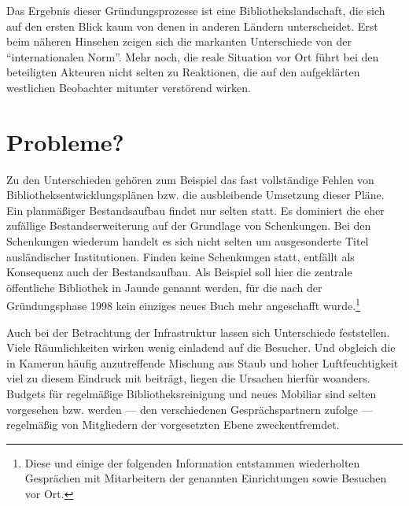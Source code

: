 \documentclass[a4paper,
fontsize=11pt,
oneside,
numbers=noperiodatend,
parskip=half-,
bibliography=totoc,
final
]{scrartcl}
\begin{document}
Das Ergebnis dieser Gründungsprozesse ist eine Bibliothekslandschaft,
die sich auf den ersten Blick kaum von denen in anderen Ländern
unterscheidet. Erst beim näheren Hinsehen zeigen sich die markanten
Unterschiede von der \enquote{internationalen Norm}. Mehr noch, die
reale Situation vor Ort führt bei den beteiligten Akteuren nicht selten
zu Reaktionen, die auf den aufgeklärten westlichen Beobachter mitunter
verstörend wirken.

\section*{Probleme?}\label{probleme}

Zu den Unterschieden gehören zum Beispiel das fast vollständige Fehlen
von Bibliotheksentwicklungsplänen bzw. die ausbleibende Umsetzung dieser
Pläne. Ein planmäßiger Bestandsaufbau findet nur selten statt. Es
dominiert die eher zufällige Bestandserweiterung auf der Grundlage von
Schenkungen. Bei den Schenkungen wiederum handelt es sich nicht selten
um ausgesonderte Titel ausländischer Institutionen. Finden keine
Schenkungen statt, entfällt als Konsequenz auch der Bestandsaufbau. Als
Beispiel soll hier die zentrale öffentliche Bibliothek in Jaunde genannt
werden, für die nach der Gründungsphase 1998 kein einziges neues Buch
mehr angeschafft wurde.\footnote{Diese und einige der folgenden
  Information entstammen wiederholten Gesprächen mit Mitarbeitern der
  genannten Einrichtungen sowie Besuchen vor Ort.}

Auch bei der Betrachtung der Infrastruktur lassen sich Unterschiede
feststellen. Viele Räumlichkeiten wirken wenig einladend auf die
Besucher. Und obgleich die in Kamerun häufig anzutreffende Mischung aus
Staub und hoher Luftfeuchtigkeit viel zu diesem Eindruck mit beiträgt,
liegen die Ursachen hierfür woanders. Budgets für regelmäßige
Bibliotheksreinigung und neues Mobiliar sind selten vorgesehen bzw.
werden --- den verschiedenen Gesprächspartnern zufolge --- regelmäßig
von Mitgliedern der vorgesetzten Ebene zweckentfremdet.
\end{document}
